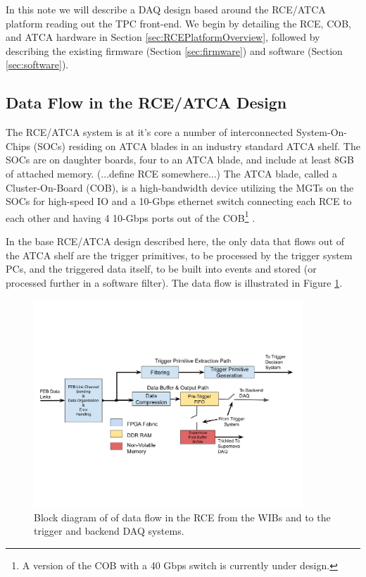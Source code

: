 In this note we will describe a DAQ design based around the RCE/ATCA platform reading out the TPC front-end.  We begin by detailing the RCE, COB, and ATCA hardware in Section \ref{sec:RCEPlatformOverview}, followed by describing the existing firmware (Section \ref{sec:firmware}) and software (Section \ref{sec:software}).  


\subsection{Data Flow in the RCE/ATCA Design }


The RCE/ATCA system is at it's core a number of interconnected System-On-Chips (SOCs) residing on  ATCA blades in an industry standard ATCA shelf.   The SOCs are on daughter boards,  four to an ATCA blade, and include at least 8GB of attached memory.  (...define RCE somewhere...) The ATCA blade, called a Cluster-On-Board (COB), is a high-bandwidth device utilizing the MGTs on the SOCs for high-speed IO and a 10-Gbps ethernet switch connecting each RCE to each other and having 4 10-Gbps ports out of the COB\footnote{A version of the COB with a 40 Gbps switch is currently under design.} .  

In the base RCE/ATCA design described here, the only data that flows out of the ATCA shelf are the trigger primitives, to be processed by the trigger system PCs, and the triggered data itself, to be built into events and stored (or processed further in a software filter).  The data flow is illustrated in Figure \ref{fig:base}.  


\begin{figure}[tb]
\centering
\includegraphics[width=0.9\textwidth]{images/base_rce_dune_dataflow.pdf}
\caption{\label{fig:base}Block diagram of of data flow in the RCE from the WIBs and to the trigger and backend DAQ systems. }
\end{figure}

